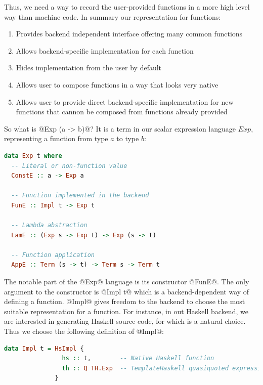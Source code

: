 \documentclass[preamble.tex]{subfiles}
\begin{document}
Thus, we need a way to record the user-provided functions in a more high level way than machine code. In summary our representation for functions:
\begin{enumerate}
\item Provides backend independent interface offering many common functions
\item Allows backend-specific implementation for each function
\item Hides implementation from the user by default
\item Allows user to compose functions in a way that looks very native
\item Allows user to provide direct backend-specific implementation for new functions that cannon be composed from functions already provided
\end{enumerate}


So what is @Exp (a -> b)@? It is a term in our scalar expression language $Exp$, representing a function from type $a$ to type $b$:
\begin{lstlisting}[basicstyle={\ttfamily},language=Haskell]
data Exp t where
  -- Literal or non-function value
  ConstE :: a -> Exp a

  -- Function implemented in the backend
  FunE :: Impl t -> Exp t

  -- Lambda abstraction
  LamE :: (Exp s -> Exp t) -> Exp (s -> t)

  -- Function application
  AppE :: Term (s -> t) -> Term s -> Term t
\end{lstlisting}



The notable part of the @Exp@ language is its constructor @FunE@. The only argument to the constructor is @Impl t@ which is a backend-dependent way of defining a function. @Impl@ gives freedom to the backend to choose the most suitable representation for a function. For instance, in out Haskell backend, we are interested in generating Haskell source code, for which   is a natural choice. Thus we choose the following definition of @Impl@:
\begin{lstlisting}[basicstyle={\ttfamily},language=Haskell]
data Impl t = HsImpl {
                hs :: t,        -- Native Haskell function
                th :: Q TH.Exp  -- TemplateHaskell quasiquoted expression
              } 
\end{lstlisting}
\end{document}
